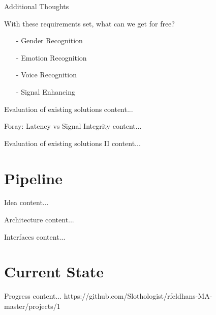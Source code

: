 \documentclass{beamer}
\begin{document}
	
	\begin{frame}{Additional Thoughts}
		\begin{alertblock}{With these requirements set, what can we get for free?}
			\pause
			\begin{itemize}
				\item[-] Gender Recognition
				\item[-] Emotion Recognition
				\item[-] Voice Recognition
				\item[-] Signal Enhancing
			\end{itemize}
		\end{alertblock}
	\end{frame}

	\begin{frame}{Evaluation of existing solutions}
		content...
	\end{frame}
	
	\begin{frame}{Foray: Latency vs Signal Integrity}
		content...
	\end{frame}
	
	\begin{frame}{Evaluation of existing solutions II}
		content...
	\end{frame}
	
	
	
	
	
	

	\section{Pipeline}
	
	\begin{frame}{Idea}
		content...
	\end{frame}
	
	\begin{frame}{Architecture}
		content...
	\end{frame}
	
	\begin{frame}{Interfaces}
		content...
	\end{frame}
	
	
	
	
	
	
	
	
	\section{Current State}
	\begin{frame}{Progress}
		content...
		https://github.com/Slothologist/rfeldhans-MA-master/projects/1
	\end{frame}
	
\end{document}
